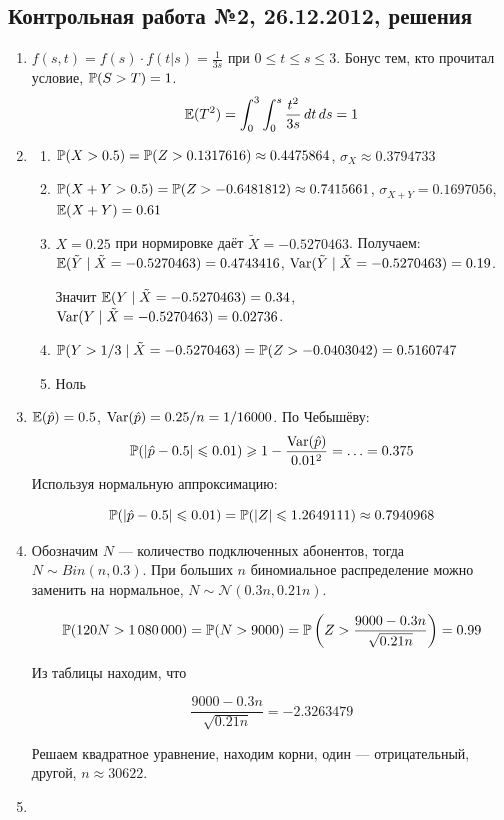 \documentclass[12pt, a4paper]{article}\usepackage[]{graphicx}\usepackage[]{color}
\newcommand{\cN}{\mathcal{N}}
\begin{document}
\subsection{Контрольная работа №2, 26.12.2012, решения}
\begin{enumerate}
\item  $f(s,t)=f(s)\cdot f(t|s)=\frac{1}{3s}$ при $0\leq t\leq s\leq 3$. Бонус тем, кто прочитал условие, $\P(S>T)=1$.
\[ \E(T^2)=\int_0^3\int_0^s \frac{t^2}{3s}\,dt\,ds=1 \]
\item
\begin{enumerate}
\item $\P(X>0.5)=\P(Z>0.1317616)\approx 0.4475864$, $\sigma_X\approx 0.3794733$
\item $\P(X+Y>0.5)=
\P(Z>-0.6481812)\approx 0.7415661$,
$\sigma_{X+Y}=0.1697056$, $\E(X+Y)=0.61$

\item $X=0.25$ при нормировке даёт $\tilde{X}=-0.5270463$. Получаем: $\E(\tilde{Y}\mid \tilde{X}=-0.5270463)=0.4743416$,  $\Var(\tilde{Y}\mid \tilde{X}=-0.5270463)=0.19$.

Значит $\E(Y \mid \tilde{X}=-0.5270463)=0.34$,  $\Var(Y\mid \tilde{X}=-0.5270463)=0.02736$.

\item $\P(Y>1/3\mid \tilde{X}=-0.5270463)=\P(Z>-0.0403042)=0.5160747$
\item Ноль
\end{enumerate}
\item $\E(\hat{p})=0.5$, $\Var(\hat{p})=0.25/n=1/16000$. По Чебышёву:
\[
\P(|\hat{p}-0.5|\leq 0.01)\geq 1-\frac{\Var(\hat{p})}{0.01^2}=\ldots=0.375
\]
Используя нормальную аппроксимацию:

\[
\P(|\hat{p}-0.5|\leq 0.01)=\P(|Z|\leq 1.2649111)\approx 0.7940968
\]
\item Обозначим $N$ — количество подключенных абонентов, тогда $N\sim Bin(n,0.3)$. При больших $n$ биномиальное распределение можно заменить на нормальное, $N\sim \cN(0.3n,0.21n)$.

\[ \P(120N>1\,080\,000)=\P(N>9000)=\P\left(Z>\frac{9000-0.3n}{\sqrt{0.21n}}\right)=0.99 \]

Из таблицы находим, что

\[ \frac{9000-0.3n}{\sqrt{0.21n}}=-2.3263479\]



Решаем квадратное уравнение, находим корни, один — отрицательный, другой, $n\approx 30622$.
\item



\end{enumerate}
\end{document}
